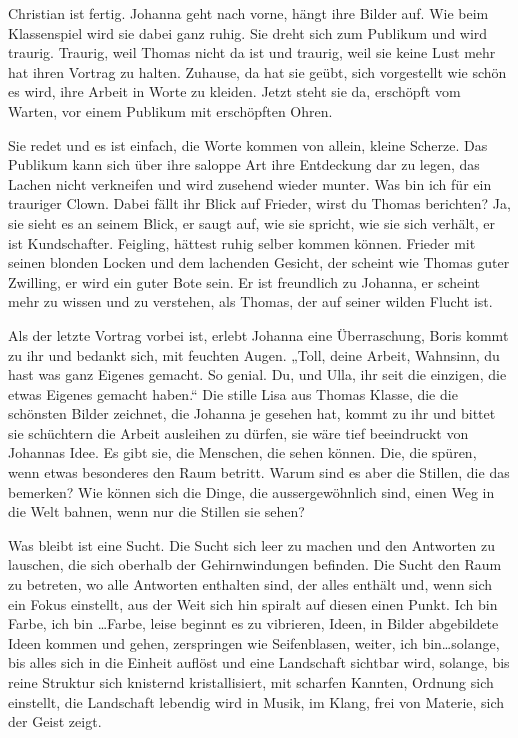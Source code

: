 \documentclass[10pt,titlepage,a5paper]{book}
\begin{document}
Christian ist fertig. Johanna geht nach vorne, hängt ihre Bilder auf. Wie beim Klassenspiel wird sie dabei ganz ruhig. Sie dreht sich zum Publikum und wird traurig. Traurig, weil Thomas nicht da ist und traurig, weil sie keine Lust mehr hat ihren Vortrag zu halten. Zuhause, da hat sie geübt, sich vorgestellt wie schön es wird, ihre Arbeit in Worte zu kleiden. Jetzt steht sie da, erschöpft vom Warten, vor einem Publikum mit erschöpften Ohren.

Sie redet und es ist einfach, die Worte kommen von allein, kleine Scherze. Das Publikum kann sich über ihre saloppe Art ihre Entdeckung dar zu legen, das Lachen nicht verkneifen und wird zusehend wieder munter. Was bin ich für ein trauriger Clown. Dabei fällt ihr Blick auf Frieder, wirst du Thomas berichten? Ja, sie sieht es an seinem Blick, er saugt auf, wie sie spricht, wie sie sich verhält, er ist Kundschafter. Feigling, hättest ruhig selber kommen können. Frieder mit seinen blonden Locken und dem lachenden Gesicht, der scheint wie Thomas guter Zwilling, er wird ein guter Bote sein. Er ist freundlich zu Johanna, er scheint mehr zu wissen und zu verstehen, als Thomas, der auf seiner wilden Flucht ist.

Als der letzte Vortrag vorbei ist, erlebt Johanna eine Überraschung, Boris kommt zu ihr und bedankt sich, mit feuchten Augen. „Toll, deine Arbeit, Wahnsinn, du hast was ganz Eigenes gemacht. So genial. Du, und Ulla, ihr seit die einzigen, die etwas Eigenes gemacht haben.“ Die stille Lisa aus Thomas Klasse, die die schönsten Bilder zeichnet, die Johanna je gesehen hat, kommt zu ihr und bittet sie schüchtern die Arbeit ausleihen zu dürfen, sie wäre tief beeindruckt von Johannas Idee. Es gibt sie, die Menschen, die sehen können. Die, die spüren, wenn etwas besonderes den Raum betritt. Warum sind es aber die Stillen, die das bemerken? Wie können sich die Dinge, die aussergewöhnlich sind, einen Weg in die Welt bahnen, wenn nur die Stillen sie  sehen?

Was bleibt ist eine Sucht. Die Sucht sich leer zu machen und den Antworten zu lauschen, die sich oberhalb der Gehirnwindungen befinden. Die Sucht den Raum zu betreten, wo alle Antworten enthalten sind, der alles enthält und, wenn sich ein Fokus einstellt, aus der Weit sich hin spiralt auf diesen einen Punkt. 
Ich bin Farbe, ich bin \dots Farbe, leise beginnt es zu vibrieren, Ideen, in Bilder abgebildete Ideen kommen und gehen, zerspringen wie Seifenblasen, weiter, ich bin\dots  solange, bis alles sich in die Einheit auflöst und eine Landschaft sichtbar wird, solange, bis reine Struktur sich knisternd kristallisiert, mit scharfen Kannten, Ordnung sich einstellt, die Landschaft lebendig wird in Musik, im Klang, frei von Materie, sich der Geist zeigt. 
\end{document}
